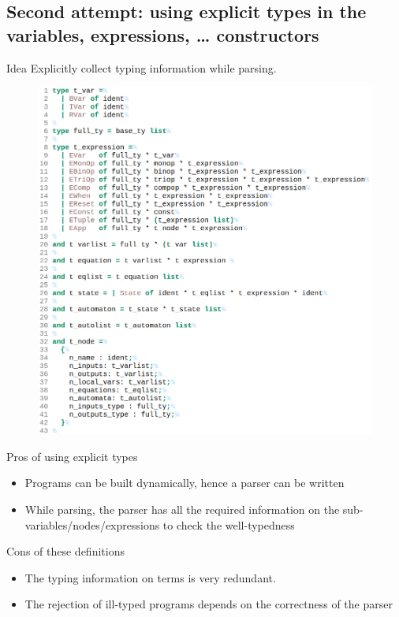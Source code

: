 \documentclass{beamer}
\begin{document}
\subsection{Second attempt: using explicit types in the variables, expressions,
\dots{} constructors}
\begin{frame}
	\begin{block}{Idea}
		Explicitly collect typing information while parsing.
	\end{block}
	\begin{figure}
		\centering
		\includegraphics[width=.6\textwidth]{imgs/explicit_types.png}
	\end{figure}
\end{frame}

\begin{frame}
	\begin{block}{Pros of using explicit types}
		\begin{itemize}
			\item Programs can be built dynamically, hence a parser can be
			written
			\item While parsing, the parser has all the required information on
			the sub-variables/nodes/expressions to check the well-typedness
		\end{itemize}
	\end{block}
	\begin{block}{Cons of these definitions}
		\begin{itemize}
			\item The typing information on terms is very redundant.
			\item The rejection of ill-typed programs depends on the correctness
			of the parser
		\end{itemize}
	\end{block}
\end{frame}
\end{document}
